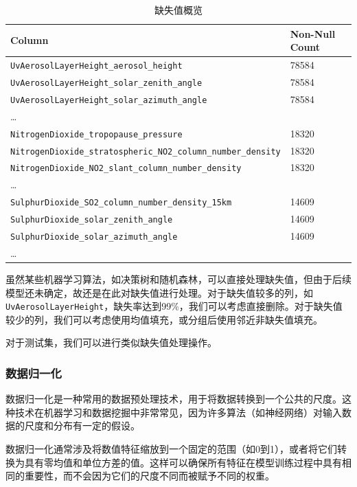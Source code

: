 \documentclass{ctexart}
\begin{document}
\begin{table}[h]
      \centering
      \begin{tabular}{l|l}
      \hline
      Column & Non-Null Count \\ \hline
      \texttt{UvAerosolLayerHeight\_aerosol\_height} & 78584 \\
      \texttt{UvAerosolLayerHeight\_solar\_zenith\_angle} & 78584 \\
      \texttt{UvAerosolLayerHeight\_solar\_azimuth\_angle} & 78584 \\
      \ldots{} & \\
      \texttt{NitrogenDioxide\_tropopause\_pressure} & 18320 \\
      \texttt{NitrogenDioxide\_stratospheric\_NO2\_column\_number\_density} & 18320 \\
      \texttt{NitrogenDioxide\_NO2\_slant\_column\_number\_density} & 18320 \\
      \ldots{} & \\
      \texttt{SulphurDioxide\_SO2\_column\_number\_density\_15km} & 14609 \\
      \texttt{SulphurDioxide\_solar\_zenith\_angle} & 14609 \\
      \texttt{SulphurDioxide\_solar\_azimuth\_angle} & 14609 \\
      \ldots{} & \\
      \hline
      \end{tabular}
      \caption{\label{tab:1}缺失值概览}
\end{table}

虽然某些机器学习算法，如决策树和随机森林，可以直接处理缺失值，但由于后续模型还未确定，故还是在此对缺失值进行处理。对于缺失值较多的列，如\texttt{UvAerosolLayerHeight}，缺失率达到99\%，我们可以考虑直接删除。对于缺失值较少的列，我们可以考虑使用均值填充，或分组后使用邻近非缺失值填充。

对于测试集，我们可以进行类似缺失值处理操作。

\subsubsection{数据归一化}

数据归一化是一种常用的数据预处理技术，用于将数据转换到一个公共的尺度。这种技术在机器学习和数据挖掘中非常常见，因为许多算法（如神经网络）对输入数据的尺度和分布有一定的假设。

数据归一化通常涉及将数值特征缩放到一个固定的范围（如0到1），或者将它们转换为具有零均值和单位方差的值。这样可以确保所有特征在模型训练过程中具有相同的重要性，而不会因为它们的尺度不同而被赋予不同的权重。
\end{document}
